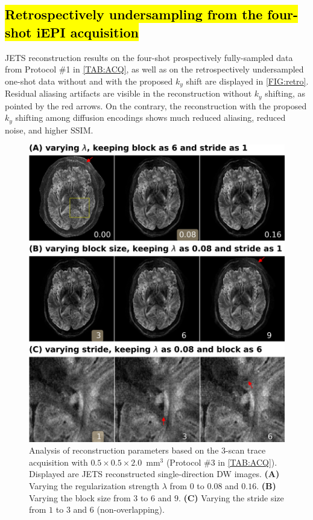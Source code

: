 \documentclass[preprint,12pt,authoryear,review]{elsarticle}
\begin{document}
    \subsection{\hl{Retrospectively undersampling from the four-shot iEPI acquisition}}

    JETS reconstruction results on
    the four-shot prospectively fully-sampled data
    from Protocol \#1 in \cref{TAB:ACQ},
    as well as on the retrospectively undersampled one-shot data
    without and with the proposed $k_y$ shift
    are displayed in \cref{FIG:retro}.
    Residual aliasing artifacts are visible in the reconstruction
    without $k_y$ shifting, as pointed by the red arrows.
    On the contrary, the reconstruction
    with the proposed $k_y$ shifting among diffusion encodings
    shows much reduced aliasing, reduced noise, and higher SSIM.


    \begin{figure}
        \centering
        \includegraphics[width=\textwidth]{../figures/fig6.png}
        \caption{Analysis of reconstruction parameters based on
        the 3-scan trace acquisition with $0.5\times0.5\times2.0$~mm$^3$
        (Protocol \#3 in \cref{TAB:ACQ}).
        Displayed are JETS reconstructed single-direction DW images.
        \textbf{(A)} Varying the regularization strength $\lambda$
        from $0$ to $0.08$ and $0.16$.
        \textbf{(B)} Varying the block size from $3$ to $6$ and $9$.
        \textbf{(C)} Varying the stride size from $1$ to $3$ and
        $6$ (non-overlapping).}
        \label{FIG:ablation}
    \end{figure}
\end{document}
